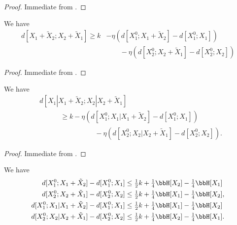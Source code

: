 \begin{proof} \leanok  Immediate from .
\end{proof}

\begin{lemma}\label{first-dist-sum}
  \leanok
  We have
  \begin{align*}
    d[X_1+\tilde X_2; X_2+\tilde X_1] \geq k &- \eta (d[X^0_1; X_1+\tilde X_2] - d[X^0_1; X_1]) \\& \qquad- \eta (d[X^0_2; X_2+\tilde X_1] - d[X^0_2; X_2])
  \end{align*}
\end{lemma}


\begin{proof}\leanok Immediate from .
\end{proof}

\begin{lemma}\label{first-cond}
  \leanok
  We have
  \begin{align*}
    & d[X_1|X_1+\tilde X_2; X_2|X_2+\tilde X_1]  \\  & \qquad\quad \geq k - \eta (d[X^0_1; X_1 | X_1 + \tilde X_2] - d[X^0_1; X_1]) \\
    & \qquad\qquad\qquad\qquad  - \eta(d[X^0_2; X_2 | X_2 + \tilde X_1] - d[X^0_2; X_2]).
  \end{align*}
\end{lemma}

\begin{proof}\leanok Immediate from .
\end{proof}

\begin{lemma}\label{first-upper}\leanok
  We have
  \begin{align*}
    d[X^0_1; X_1+\tilde X_2] - d[X^0_1; X_1] &\leq \tfrac{1}{2} k + \tfrac{1}{4} \bbH[X_2] - \tfrac{1}{4} \bbH[X_1]\\
    d[X^0_2;X_2+\tilde X_1] - d[X^0_2; X_2] &\leq \tfrac{1}{2} k + \tfrac{1}{4} \bbH[X_1] - \tfrac{1}{4} \bbH[X_2], \\
    d[X_1^0;X_1|X_1+\tilde X_2] - d[X_1^0;X_1] &\leq \tfrac{1}{2} k + \tfrac{1}{4} \bbH[X_1] - \tfrac{1}{4} \bbH[X_2]  \\
    d[X_2^0; X_2|X_2+\tilde X_1] - d[X_2^0; X_2] &\leq \tfrac{1}{2}k + \tfrac{1}{4} \bbH[X_2] - \tfrac{1}{4} \bbH[X_1].
  \end{align*}
\end{lemma}

